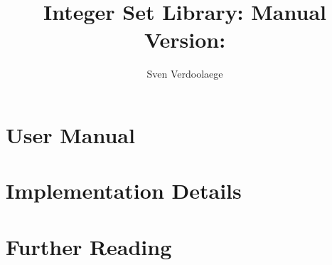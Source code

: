 \documentclass{report}
\numberwithin{theorem}{section}
\numberwithin{def}{section}
\numberwithin{example}{section}
\begin{document}
\title{Integer Set Library: Manual\\
\small Version:  }
\author{Sven Verdoolaege}

\maketitle
\tableofcontents

\chapter{User Manual}



\chapter{Implementation Details}



\chapter{Further Reading}



\printbibliography
\end{document}
